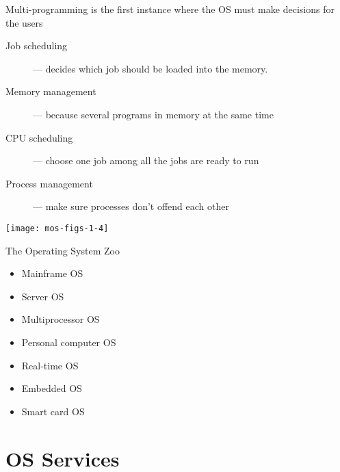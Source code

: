 \begin{frame}
  \begin{block}{Multi-programming is the first instance where the OS must make decisions
      for the users}
    \begin{minipage}{.65\linewidth}
      \begin{description}
      \item[Job scheduling] --- decides which job should be loaded into the memory.
      \item[Memory management] --- because several programs in memory at the same time
      \item[CPU scheduling] --- choose one job among all the jobs are ready to run
      \item[Process management] --- make sure processes don't offend each other
      \end{description}
    \end{minipage}\quad
    \begin{minipage}{.3\linewidth}
      \texttt{[image: mos-figs-1-4]}
    \end{minipage}
  \end{block}
\end{frame}

\begin{frame}{The Operating System Zoo}
    \begin{itemize}
    \item {\huge Mainframe OS}
    \item {\LARGE Server OS}
    \item {\Large Multiprocessor OS}
    \item {\large Personal computer OS}
    \item Real-time OS
    \item {\small Embedded OS}
    \item {\scriptsize Smart card OS}
    \end{itemize}
\end{frame}

\section{OS Services}

